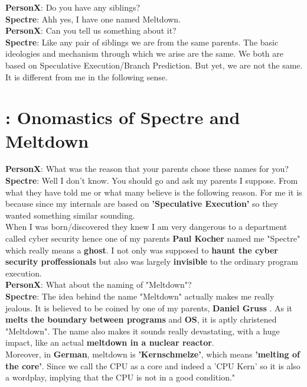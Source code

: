 \documentclass[12pt]{article}
\begin{document}
\begin{appendices}
	\textbf{PersonX}: Do you have any siblings?\\
	
	\textbf{Spectre}: Ahh yes, I have one named Meltdown.\\
	
	\textbf{PersonX}: Can you tell us something about it?\\
	
	\textbf{Spectre}: Like any pair of siblings we are from  the same parents. The basic ideologies and mechanism through which we arise are the same. We both are based on Speculative Execution/Branch Prediction. But yet, we are not the same. It is different from me in the following sense.
	
	\section{:  Onomastics of Spectre and Meltdown \cite{NameOrigin}}
	
	\textbf{PersonX}: What was the reason that your parents chose these names for you?\\
	
	\textbf{Spectre}: Well I don't know. You should go and ask my parents I suppose. From what they have told me or what many believe is the following reason. For me it is because since my internals are based on \textbf{'Speculative Execution'}  so they wanted something similar sounding.\\ When I was born/discovered they knew I am very dangerous to a department called cyber security hence one of my parents \textbf{Paul Kocher} named me "Spectre" which really means a \textbf{ghost}. I not only was supposed to \textbf{haunt the cyber security proffessionals} but also was largely \textbf{invisible} to the ordinary program execution.\\
	
	\textbf{PersonX}: What about the naming of "Meltdown"?\\
	
	\textbf{Spectre}: The idea behind the name "Meltdown" actually makes me really jealous. It is believed to be coined by one of my parents, \textbf{Daniel Gruss} . As it \textbf{melts the boundary} \textbf{between programs} and \textbf{OS}, it is aptly christened "Meltdown". The name also makes it sounds really devastating, with a huge impact, like an actual \textbf{meltdown in a nuclear reactor}.\\
	Moreover, in \textbf{German}, meltdown is \textbf{'Kernschmelze'}, which means \textbf{'melting of the core'}. Since we call the CPU as a core and indeed a 'CPU Kern' so it is also a wordplay, implying that the CPU is not in a good condition."



\end{appendices}
\end{document}
